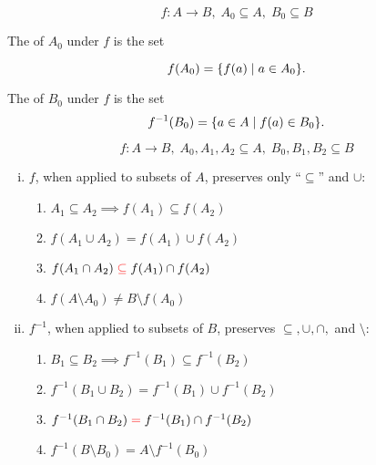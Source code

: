 \begin{frame}{}
  \[
    f: A \to B,\; A_0 \subseteq A,\; B_0 \subseteq B
  \]

  \begin{definition}[Image]
    The  of $A_0$ under $f$ is the set

    \[
      f(A_0) = \{f(a) \mid a \in A_0\}.
    \]
  \end{definition}

  \vspace{0.60cm}
  \begin{definition}
    The  of $B_0$ under $f$ is the set
    \[
      f^{-1}(B_0) = \{a \in A \mid f(a) \in B_0\}.
    \]
  \end{definition}
\end{frame}

\begin{frame}{}
  \begin{theorem}
    \[
      f: A \to B,\; A_0, A_1, A_2 \subseteq A,\; B_0, B_1, B_2 \subseteq B
    \]

    \vspace{-0.10cm}
    \begin{enumerate}[(i)]
      \setlength{\itemsep}{10pt}
      \item $f$, when applied to subsets of $A$, preserves only ``$\subseteq$'' and $\cup$:
	\begin{enumerate}[(1)]
	  \setlength{\itemsep}{4pt}
	  \item $A_1 \subseteq A_2 \implies f(A_1) \subseteq f(A_2)$
	  \item $f(A_1 \cup A_2) = f(A_1) \cup f(A_2)$
	  \item $f(A_1 \cap A_2) \textcolor{red}{\;\subseteq\;} f(A_1) \cap f(A_2)$
	  \item $f(A \setminus A_0) \neq B \setminus f(A_0)$
	\end{enumerate}
      \item $f^{-1}$, when applied to subsets of $B$, preserves $\subseteq, \cup, \cap,$ and $\setminus$:
	\begin{enumerate}[(1)]
	  \setlength{\itemsep}{4pt}
	  \setcounter{enumii}{4}
	  \item $B_1 \subseteq B_2 \implies f^{-1}(B_1) \subseteq f^{-1}(B_2)$
	  \item $f^{-1}(B_1 \cup B_2) = f^{-1}(B_1) \cup f^{-1}(B_2)$
	  \item $f^{-1}(B_1 \cap B_2) \textcolor{red}{\;=\;} f^{-1}(B_1) \cap f^{-1}(B_2)$
	  \item $f^{-1}(B \setminus B_0) = A \setminus f^{-1}(B_0)$
	\end{enumerate}
    \end{enumerate}
  \end{theorem}
\end{frame}

